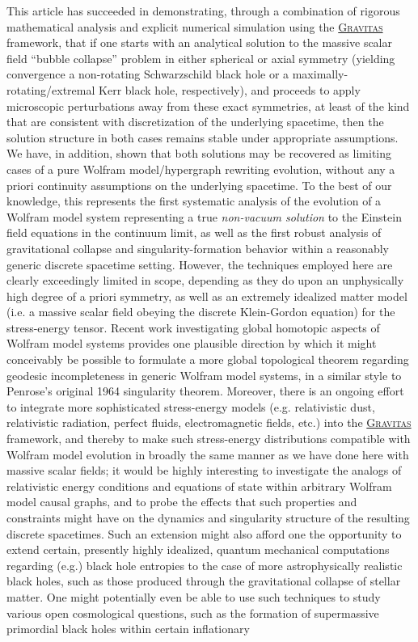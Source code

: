 \documentclass{article}
\begin{document}
This article has succeeded in demonstrating, through a combination of rigorous mathematical analysis and explicit numerical simulation using the \href{https://github.com/JonathanGorard/Gravitas}{\textsc{Gravitas}} framework, that if one starts with an analytical solution to the massive scalar field ``bubble collapse'' problem in either spherical or axial symmetry (yielding convergence a non-rotating Schwarzschild black hole or a maximally-rotating/extremal Kerr black hole, respectively), and proceeds to apply microscopic perturbations away from these exact symmetries, at least of the kind that are consistent with discretization of the underlying spacetime, then the solution structure in both cases remains stable under appropriate assumptions. We have, in addition, shown that both solutions may be recovered as limiting cases of a pure Wolfram model/hypergraph rewriting evolution, without any a priori continuity assumptions on the underlying spacetime. To the best of our knowledge, this represents the first systematic analysis of the evolution of a Wolfram model system representing a true \textit{non-vacuum solution} to the Einstein field equations in the continuum limit, as well as the first robust analysis of gravitational collapse and singularity-formation behavior within a reasonably generic discrete spacetime setting. However, the techniques employed here are clearly exceedingly limited in scope, depending as they do upon an unphysically high degree of a priori symmetry, as well as an extremely idealized matter model (i.e. a massive scalar field obeying the discrete Klein-Gordon equation) for the stress-energy tensor. Recent work investigating global homotopic aspects of Wolfram model systems\cite{arsiwalla}\cite{arsiwalla2} provides one plausible direction by which it might conceivably be possible to formulate a more global topological theorem regarding geodesic incompleteness in generic Wolfram model systems, in a similar style to Penrose's original 1964 singularity theorem\cite{penrose}. Moreover, there is an ongoing effort to integrate more sophisticated stress-energy models (e.g. relativistic dust, relativistic radiation, perfect fluids, electromagnetic fields, etc.) into the \href{https://github.com/JonathanGorard/Gravitas}{\textsc{Gravitas}} framework, and thereby to make such stress-energy distributions compatible with Wolfram model evolution in broadly the same manner as we have done here with massive scalar fields; it would be highly interesting to investigate the analogs of relativistic energy conditions and equations of state within arbitrary Wolfram model causal graphs, and to probe the effects that such properties and constraints might have on the dynamics and singularity structure of the resulting discrete spacetimes. Such an extension might also afford one the opportunity to extend certain, presently highly idealized, quantum mechanical computations regarding (e.g.) black hole entropies\cite{maldacena}\cite{shah} to the case of more astrophysically realistic black holes, such as those produced through the gravitational collapse of stellar matter. One might potentially even be able to use such techniques to study various open cosmological questions, such as the formation of supermassive primordial black holes within certain inflationary 
\end{document}

